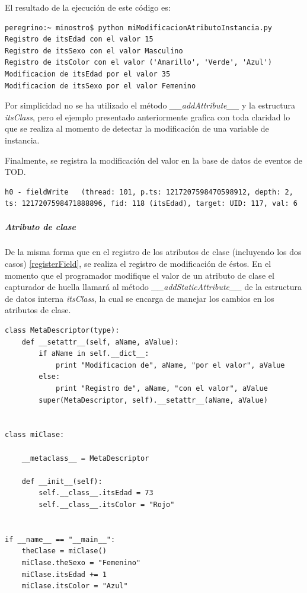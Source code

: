 \documentclass[12pt,legalpaper]{report}
\begin{document}
El resultado de la ejecución de este código es:

\begin{singlespace}
\begin{lstlisting}[style=consola,numbers=none]
peregrino:~ minostro$ python miModificacionAtributoInstancia.py
Registro de itsEdad con el valor 15
Registro de itsSexo con el valor Masculino
Registro de itsColor con el valor ('Amarillo', 'Verde', 'Azul')
Modificacion de itsEdad por el valor 35
Modificacion de itsSexo por el valor Femenino
\end{lstlisting}
\end{singlespace}

Por simplicidad no se ha utilizado el método  \textit{\_\_addAttribute\_\_} y la estructura \textit{itsClass}, pero el ejemplo presentado anteriormente grafica con toda claridad lo que se realiza al momento de detectar la modificación de una variable de instancia.

Finalmente, se registra la modificación del valor en la base de datos de eventos de TOD.

\begin{singlespace}
\begin{lstlisting}[style=consola,numbers=none]
h0 - fieldWrite   (thread: 101, p.ts: 1217207598470598912, depth: 2, ts: 1217207598471888896, fid: 118 (itsEdad), target: UID: 117, val: 6
\end{lstlisting}
\end{singlespace}

					
					\subparagraph{Atributo de clase}

De la misma forma que en el registro de los atributos de clase (incluyendo los dos casos) \ref{registerField}, se realiza el registro de modificación de éstos.  En el momento que el programador modifique el valor de un atributo de clase el capturador de huella llamará al método \textit{\_\_addStaticAttribute\_\_} de la estructura de datos interna \textit{itsClass}, la cual se encarga de manejar los cambios en los atributos de clase.

\begin{singlespace}
\begin{lstlisting}[style=Python]
class MetaDescriptor(type):
    def __setattr__(self, aName, aValue):
        if aName in self.__dict__:
            print "Modificacion de", aName, "por el valor", aValue
        else:
            print "Registro de", aName, "con el valor", aValue
        super(MetaDescriptor, self).__setattr__(aName, aValue)
        
        
class miClase:
    
    __metaclass__ = MetaDescriptor
    
    def __init__(self):
        self.__class__.itsEdad = 73
        self.__class__.itsColor = "Rojo"
    

if __name__ == "__main__":
    theClase = miClase()
    miClase.theSexo = "Femenino"
    miClase.itsEdad += 1
    miClase.itsColor = "Azul"
\end{lstlisting}
\end{singlespace}
\end{document}
